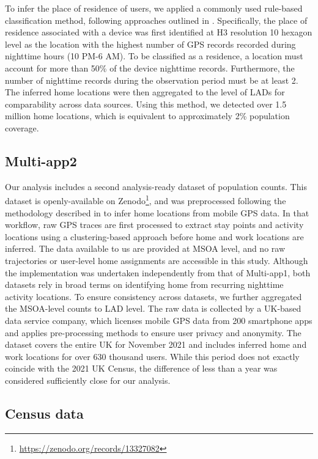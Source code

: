 \documentclass[]{rsos}%
\begin{document}
To infer the place of residence of users, we applied a commonly used
rule-based classification method, following approaches outlined in
\citep{zhong25, unstatsMPDMS2025, Verma2024}. Specifically, the place of
residence associated with a device was first identified at H3 resolution
10 hexagon level as the location with the highest number of GPS records
recorded during nighttime hours (10 PM-6 AM). To be classified as a
residence, a location must account for more than 50\% of the device
nighttime records. Furthermore, the number of nighttime records during
the observation period must be at least 2. The inferred home locations
were then aggregated to the level of LADs for comparability across data
sources. Using this method, we detected over 1.5 million home locations,
which is equivalent to approximately 2\% population coverage.

\subsection{Multi-app2}\label{multi-app2}

Our analysis includes a second analysis-ready dataset of
population counts. This dataset is openly-available on Zenodo\footnote{\url{https://zenodo.org/records/13327082}}, and
was preprocessed following the methodology described in \citep{zhong25} to
infer home locations from mobile GPS data. In that workflow, raw GPS
traces are first processed to extract stay points and activity locations
using a clustering-based approach before home and work locations are
inferred. The data available to us are provided at MSOA level, and no
raw trajectories or user-level home assignments are accessible in this
study. Although the implementation was undertaken independently from
that of Multi-app1, both datasets rely in broad terms on identifying
home from recurring nighttime activity locations. To ensure consistency
across datasets, we further aggregated the MSOA-level counts to LAD
level. The raw data is collected by a UK-based data service company,
which licenses mobile GPS data from 200 smartphone apps and applies
pre-processing methods to ensure user privacy and anonymity. The dataset
covers the entire UK for November 2021 and includes inferred home and
work locations for over 630 thousand users. While this period does not
exactly coincide with the 2021 UK Census, the difference of less than a
year was considered sufficiently close for our analysis.

\subsection{Census data}\label{census-data}
\end{document}

